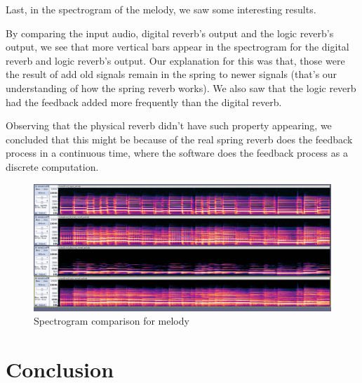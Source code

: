 \documentclass[12pt]{article}
\begin{document}
\newpage


Last, in the spectrogram of the melody, we saw some interesting results.

By comparing the input audio, digital reverb's output and the logic reverb's output, we see that more vertical bars appear in the spectrogram for the digital reverb and logic reverb's output. Our explanation for this was that, those were the result of add old signals remain in the spring to newer signals (that's our understanding of how the spring reverb works). We also saw that the logic reverb had the feedback added more frequently than the digital reverb.

Observing that the physical reverb didn't have such property appearing, we concluded that this might be because of the real spring reverb does the feedback process in a continuous time, where the software does the feedback process as a discrete computation.

\begin{figure}[h]
	\center
	\includegraphics[width=\linewidth]{audio_comparison/melody_comparison_spec.png}
	\caption{Spectrogram comparison for melody}
\end{figure}


\newpage
\section{Conclusion}
\end{document}
